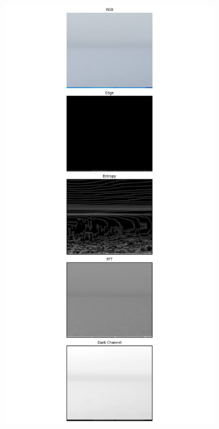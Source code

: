 \begin{figure}
\begin{subfigure}[b]{0.15\textwidth}
    \label{subfig:bin0}
        \caption{}
  \end{subfigure}
  \begin{subfigure}[b]{0.15\textwidth}
    \includegraphics[width=\textwidth, trim={7.5cm 0 7.5cm 0},clip]{imgs/examples/exp_0_featuresMiles_0.9320591049747102_featuresM_1500_features.png}

\end{subfigure}
\end{figure}

